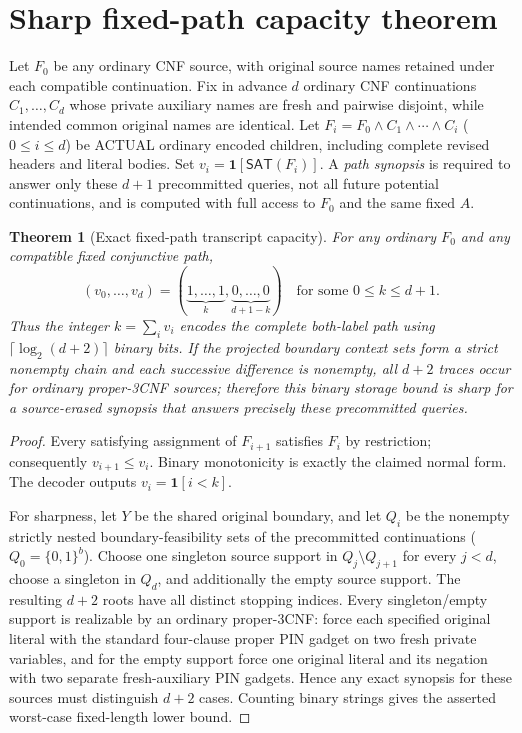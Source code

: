 \documentclass[11pt]{article}
\newtheorem{theorem}{Theorem}
\newcommand{\SAT}{\mathsf{SAT}}
\begin{document}
\section{Sharp fixed-path capacity theorem}
Let $F_0$ be any ordinary CNF source, with original source names retained
under each compatible continuation. Fix in advance $d$ ordinary CNF
continuations $C_1,\ldots,C_d$ whose private auxiliary names are fresh
and pairwise disjoint, while intended common original names are identical.
Let $F_i=F_0\wedge C_1\wedge\cdots\wedge C_i$ ($0\le i\le d$)
be ACTUAL ordinary encoded children, including complete revised headers and
literal bodies. Set $v_i=\mathbf1[\SAT(F_i)]$.
A \emph{path synopsis} is required to answer only these $d+1$
precommitted queries, not all future potential continuations, and is
computed with full access to $F_0$ and the same fixed $A$.

\begin{theorem}[Exact fixed-path transcript capacity]\label{th:path}
For any ordinary $F_0$ and any compatible fixed conjunctive path,
\[
 (v_0,\ldots,v_d)=(\underbrace{1,\ldots,1}_{k},
       \underbrace{0,\ldots,0}_{d+1-k})
 \quad\text{for some }0\le k\le d+1.
\]
Thus the integer $k=\sum_i v_i$ encodes the complete both-label path
using $\lceil\log_2(d+2)\rceil$ binary bits. If the projected boundary
context sets form a strict nonempty chain and each successive difference
is nonempty, all $d+2$ traces occur for ordinary proper-3CNF sources;
therefore this binary storage bound is sharp for a source-erased synopsis
that answers precisely these precommitted queries.
\end{theorem}
\begin{proof}
Every satisfying assignment of $F_{i+1}$ satisfies $F_i$ by
restriction; consequently $v_{i+1}\le v_i$. Binary monotonicity is
exactly the claimed normal form. The decoder outputs $v_i=\mathbf1[i<k]$.

For sharpness, let $Y$ be the shared original boundary, and let $Q_i$
be the nonempty strictly nested boundary-feasibility sets of the
precommitted continuations ($Q_0=\{0,1\}^b$). Choose one singleton
source support in $Q_{j}\setminus Q_{j+1}$ for every $j<d$,
choose a singleton in $Q_d$, and additionally the empty source support.
The resulting $d+2$ roots have all distinct stopping indices.
Every singleton/empty support is realizable by an ordinary proper-3CNF:
force each specified original literal with the standard four-clause
proper PIN gadget on two fresh private variables, and for the empty
support force one original literal and its negation with two separate
fresh-auxiliary PIN gadgets. Hence any exact synopsis for these
sources must distinguish $d+2$ cases. Counting binary strings gives
the asserted worst-case fixed-length lower bound.
\end{proof}
\end{document}
